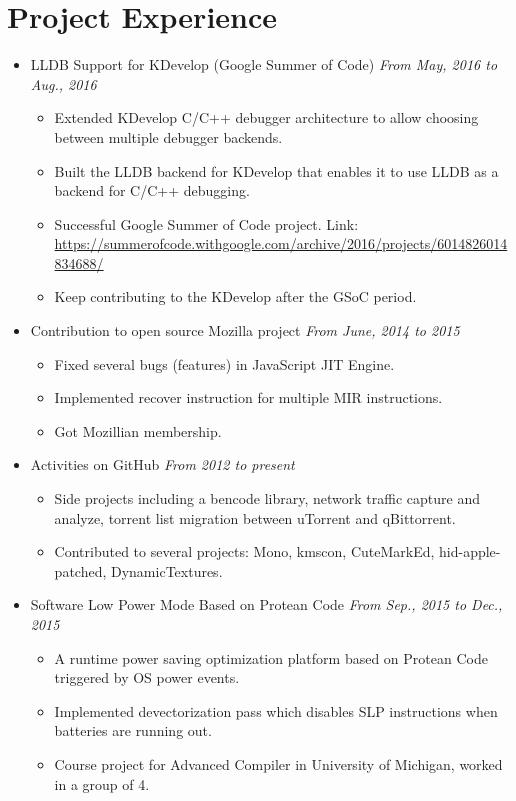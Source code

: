 \documentclass[a4paper,11pt]{article}
\begin{document}
\section{Project Experience}

\begin{itemize}
    \item LLDB Support for KDevelop (Google Summer of Code) \hfill \textit{From May, 2016 to Aug., 2016}
    \begin{itemize}
        \item Extended KDevelop C/C++ debugger architecture to allow choosing between multiple debugger 
backends.
        \item Built the LLDB backend for KDevelop that enables it to use LLDB as a backend for C/C++ 
debugging.
\item Successful Google Summer of Code project. Link:
\url{https://summerofcode.withgoogle.com/archive/2016/projects/6014826014834688/}
        \item Keep contributing to the KDevelop after the GSoC period.
    \end{itemize}

    \item Contribution to open source Mozilla project \hfill \textit{From June, 2014 to 2015}
    \begin{itemize}
        \item Fixed several bugs (features) in JavaScript JIT Engine.
        \item Implemented recover instruction for multiple MIR instructions.
        \item Got Mozillian membership.
    \end{itemize}

    \item Activities on GitHub \hfill \textit{From 2012 to present}
    \begin{itemize}
        \item Side projects including a bencode library, network traffic capture and analyze, torrent list
migration between uTorrent and qBittorrent.
        \item Contributed to several projects: Mono, kmscon, CuteMarkEd, hid-apple-patched, DynamicTextures.
    \end{itemize}

    \item Software Low Power Mode Based on Protean Code \hfill \textit{From Sep., 2015 to Dec., 2015}
    \begin{itemize}
        \item A runtime power saving optimization platform based on Protean Code triggered by OS power events.
        \item Implemented devectorization pass which disables SLP instructions when batteries are running out.
        \item Course project for Advanced Compiler in University of Michigan, worked in a group of 4.
    \end{itemize}


\end{itemize}
\end{document}
